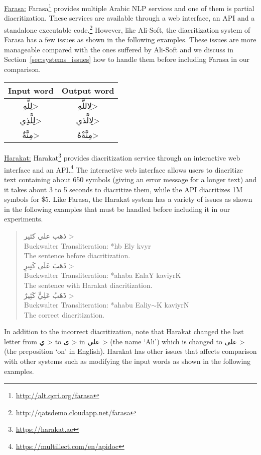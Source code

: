 \documentclass[conference]{IEEEtran}
\newcommand{\softpara}[1]{\smallskip \noindent \underline{#1}}
\begin{document}
\softpara{Farasa:}
Farasa\footnote{\url{http://alt.qcri.org/farasa}} provides multiple Arabic NLP services and one of them is partial diacritization. These services are available through a web interface, an API and a standalone executable code.\footnote{\url{http://qatsdemo.cloudapp.net/farasa}}
However, like Ali-Soft, the diacritization system of Farasa has a few issues as shown in the following examples. These issues are more manageable compared with the ones suffered by Ali-Soft and we discuss in Section~\ref{sec:systems_issues} how to handle them before including Farasa in our comparison.
\begin{center}
\begin{tabular}{|c|c|}
\hline
Input word & Output word \\ \hline
\<لِلَّهِ> & 
\<لِاللَّهِ> \\ \hline
\<لِلَّذِي> & 
\<لِالَّذي> \\ \hline
\<مِنَّةٌ> & 
\<مِنَّةْهُ> \\ \hline
\end{tabular}
\end{center}

\softpara{Harakat:}
Harakat\footnote{\url{https://harakat.ae}} provides diacritization service through an interactive web interface and an API.\footnote{\url{https://multillect.com/en/apidoc}}
The interactive web interface allows users to diacritize text containing about 650 symbols (giving an error message for a longer text) and it takes about 3 to 5 seconds to diacritize them, while the API diacritizes 1M symbols for \$5.
Like Farasa, the Harakat system has a variety of issues as shown in the following examples that must be handled before including it in our experiments.
\begin{quote}
\centering
\<
ذهب علي كثير
> \\
Buckwalter Transliteration: *hb Ely kvyr \\
The sentence before diacritization. \\
\<
ذَهَبَ عَلَى كَثِيرٍ
> \\
Buckwalter Transliteration: *ahaba EalaY kaviyrK \\
The sentence with Harakat diacritization. \\
\<
ذَهَبُ عَلِيٍّ كَثِيرٌ
> \\
Buckwalter Transliteration: *ahabu Ealiy$\sim$K kaviyrN \\
The correct diacritization. \\
\end{quote}
In addition to the incorrect diacritization, note that Harakat changed the last letter from
\<
ي
>
to
\<
ى
>
in
\<
علي
>
(the name `Ali') which is changed to
\<
على
>
(the preposition `on' in English).
Harakat has other issues that affects comparison with other systems such as modifying the input words as shown in the following examples.
\end{document}
